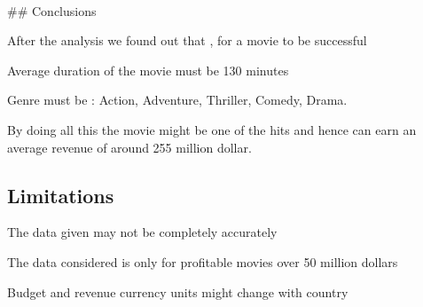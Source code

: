 \documentclass[11pt]{article}
\begin{document}
    \begin{center}
    \end{center}
    { \hspace*{\fill} \\}
    
     \#\# Conclusions

After the analysis we found out that , for a movie to be successful

Average duration of the movie must be 130 minutes

Genre must be : Action, Adventure, Thriller, Comedy, Drama.

By doing all this the movie might be one of the hits and hence can earn
an average revenue of around 255 million dollar.

    \subsection{Limitations}\label{limitations}

    The data given may not be completely accurately

The data considered is only for profitable movies over 50 million
dollars

Budget and revenue currency units might change with country


    
    
    
    
\end{document}
